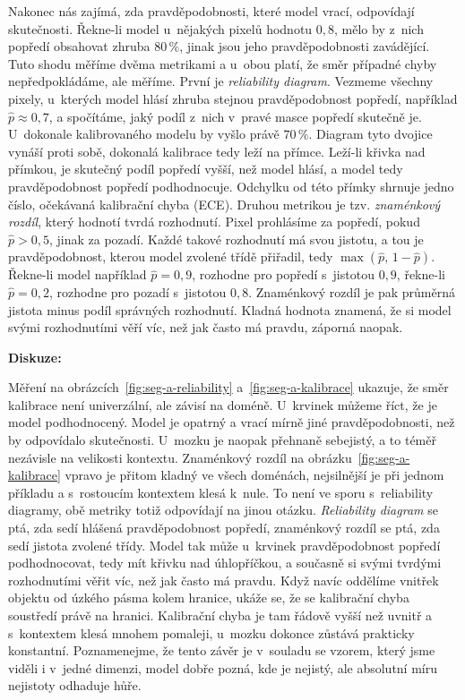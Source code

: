 Nakonec nás zajímá, zda pravděpodobnosti, které model vrací, odpovídají skutečnosti.
Řekne-li model u~nějakých pixelů hodnotu $0{,}8$, mělo by z~nich popředí obsahovat zhruba $80\,\%$, jinak jsou jeho pravděpodobnosti zavádějící.
Tuto shodu měříme dvěma metrikami a u~obou platí, že směr případné chyby nepředpokládáme, ale měříme.
První je \emph{reliability diagram}.
Vezmeme všechny pixely, u~kterých model hlásí zhruba stejnou pravděpodobnost popředí, například $\hat p \approx 0{,}7$, a spočítáme, jaký podíl z~nich v~pravé masce popředí skutečně je.
U~dokonale kalibrovaného modelu by vyšlo právě $70\,\%$.
Diagram tyto dvojice vynáší proti sobě, dokonalá kalibrace tedy leží na přímce.
Leží-li křivka nad přímkou, je skutečný podíl popředí vyšší, než model hlásí, a model tedy pravděpodobnost popředí podhodnocuje.
Odchylku od této přímky shrnuje jedno číslo, očekávaná kalibrační chyba (ECE).
Druhou metrikou je tzv. \textit{znaménkový rozdíl}, který hodnotí tvrdá rozhodnutí.
Pixel prohlásíme za popředí, pokud $\hat p > 0{,}5$, jinak za pozadí.
Každé takové rozhodnutí má svou jistotu, a tou je pravděpodobnost, kterou model zvolené třídě přiřadil, tedy $\max(\hat p,\, 1-\hat p)$.
Řekne-li model například $\hat p = 0{,}9$, rozhodne pro popředí s~jistotou $0{,}9$, řekne-li $\hat p = 0{,}2$, rozhodne pro pozadí s~jistotou $0{,}8$.
Znaménkový rozdíl je pak průměrná jistota minus podíl správných rozhodnutí.
Kladná hodnota znamená, že si model svými rozhodnutími věří víc, než jak často má pravdu, záporná naopak.
\par

\textbf{Diskuze:}

Měření na obrázcích~\ref{fig:seg-a-reliability} a~\ref{fig:seg-a-kalibrace} ukazuje, že směr kalibrace není univerzální, ale závisí na doméně.
U~krvinek můžeme říct, že je model podhodnocený.
Model je opatrný a vrací mírně jiné pravděpodobnosti, než by odpovídalo skutečnosti.
U~mozku je naopak přehnaně sebejistý, a to téměř nezávisle na velikosti kontextu.
Znaménkový rozdíl na obrázku~\ref{fig:seg-a-kalibrace} vpravo je přitom kladný ve všech doménách, nejsilnější je při jednom příkladu a s~rostoucím kontextem klesá k~nule.
To není ve sporu s~reliability diagramy, obě metriky totiž odpovídají na jinou otázku.
\emph{Reliability diagram} se ptá, zda sedí hlášená pravděpodobnost popředí, znaménkový rozdíl se ptá, zda sedí jistota zvolené třídy.
Model tak může u~krvinek pravděpodobnost popředí podhodnocovat, tedy mít křivku nad úhlopříčkou, a současně si svými tvrdými rozhodnutími věřit víc, než jak často má pravdu.
Když navíc oddělíme vnitřek objektu od úzkého pásma kolem hranice, ukáže se, že se kalibrační chyba soustředí právě na hranici.
Kalibrační chyba je tam řádově vyšší než uvnitř a s~kontextem klesá mnohem pomaleji, u~mozku dokonce zůstává prakticky konstantní.
Poznamenejme, že tento závěr je v~souladu se vzorem, který jsme viděli i v~jedné dimenzi, model dobře pozná, kde je nejistý, ale absolutní míru nejistoty odhaduje hůře.
\par


